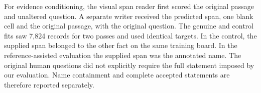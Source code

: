 For evidence conditioning, the visual span reader first scored the original passage and unaltered question. A separate writer received the predicted span, one blank cell and the original passage, with the original question. The genuine and control fits saw 7,824 records for two passes and used identical targets. In the control, the supplied span belonged to the other fact on the same training board. In the reference-assisted evaluation the supplied span was the annotated name. The original human questions did not explicitly require the full statement imposed by our evaluation. Name containment and complete accepted statements are therefore reported separately.
